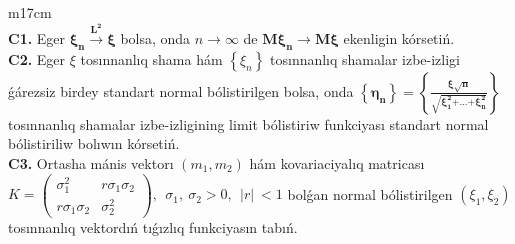 \documentclass{article}
\begin{document}
\begin{tabular}{m{17cm}}
 \\
\textbf{C1.} Eger \(\mathbf{\xi}_{\mathbf{n}}\overset{\mathbf{L}^{\mathbf{2}}}{\rightarrow}\mathbf{\xi}\) bolsa, onda \(n \rightarrow \infty\) de \(\mathbf{M}\mathbf{\xi}_{\mathbf{n}}\mathbf{\rightarrow M\xi}\) ekenligin kórsetiń.
 \\
\textbf{C2.} 
Eger \(\xi\) tosınnanlıq shama hám \(\left\{ \xi_{n} \right\}\) tosınnanlıq shamalar izbe-izligi ǵárezsiz birdey standart normal bólistirilgen bolsa, onda \(\left\{ \mathbf{\eta}_{\mathbf{n}} \right\}\mathbf{=}\left\{ \frac{\mathbf{\xi}\sqrt{\mathbf{n}}}{\sqrt{\mathbf{\xi}_{\mathbf{1}}^{\mathbf{2}}\mathbf{+}\mathbf{...}\mathbf{+}\mathbf{\xi}_{\mathbf{n}}^{\mathbf{2}}}} \right\}\) tosınnanlıq shamalar izbe-izligining limit bólistiriw funkciyası standart normal bólistiriliw bolıwın kórsetiń.
 \\
\textbf{C3.} Ortasha mánis vektorı \(\left( m_{1},m_{2} \right)\) hám kovariaciyalıq matricası\(K = \begin{pmatrix}
\sigma_{1}^{2} & r\sigma_{1}\sigma_{2} \\
r\sigma_{1}\sigma_{2} & \sigma_{2}^{2}
\end{pmatrix},\ \ \sigma_{1},\ \sigma_{2} > 0,\ \ |r|\  < 1\) bolǵan normal bólistirilgen \(\left( \xi_{1},\xi_{2} \right)\) tosınnanlıq vektordıń tıǵızlıq funkciyasın tabıń.
 \\

\end{tabular}
\vspace{1cm}
\end{document}
